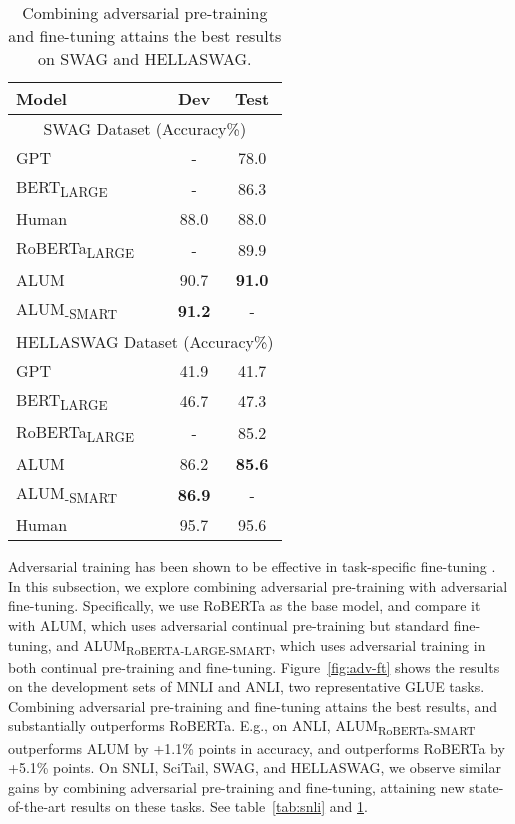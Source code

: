 \documentclass[11pt,a4paper]{article}
\newcommand\DNAME{ALUM}
\newcommand{\robertalarge}{RoBERTa}
\newcommand{\alumrobertalarge}{ALUM}
\begin{document}
\begin{table}[htb!]
	\begin{center}
		\begin{tabular}{@{\hskip1pt}l | c | c @{\hskip1pt}}
	\toprule    
	
	   \bf Model &Dev& Test  \\ \hline 

		\multicolumn{3}{c}{ SWAG Dataset (Accuracy\%)}  \\ \hline 
		GPT \cite{gpt22019} &- & 78.0 \\
		\hline
		BERT\textsubscript{LARGE} \cite{devlin2018bert} &-& 86.3\\ \hline		
		Human\cite{zellers2018swag} & 88.0 &88.0 \\ \hline
		RoBERTa\textsubscript{LARGE} \cite{liu2019roberta} &-& 89.9\\ \hline				
		{\alumrobertalarge{}}&90.7& \textbf{91.0}\\ \hline	
{\alumrobertalarge{}}\textsubscript{-SMART}&\textbf{91.2}& -\\ \hline		
		\hline
		\multicolumn{3}{c}{HELLASWAG Dataset (Accuracy\%)}  \\ \hline 
		GPT \cite{zellers2019hellaswag} &41.9 &41.7 \\ \hline
		BERT\textsubscript{LARGE}\cite{zellers2019hellaswag} &46.7& 47.3\\ \hline		
RoBERTa\textsubscript{LARGE}\cite{liu2019roberta} &-& 85.2\\ \hline		
		{\alumrobertalarge{}} &86.2& \textbf{85.6}\\ \hline
{\alumrobertalarge{}}\textsubscript{-SMART}&\textbf{86.9}& -\\ \hline \hline	
		Human & 95.7 &95.6 \\ 	
		\bottomrule
		\end{tabular}
	\end{center}
	\caption{Combining adversarial pre-training and fine-tuning attains the best results on SWAG and HELLASWAG.}
\label{tab:swag}
\end{table}


Adversarial training has been shown to be effective in task-specific fine-tuning \cite{jiang2019smart, zhu2019freelb}. In this subsection, we explore combining adversarial pre-training with adversarial fine-tuning.  
Specifically, we use \robertalarge{} as the base model, and compare it with \alumrobertalarge{}, which uses adversarial continual pre-training but standard fine-tuning, and 
{\DNAME}\textsubscript{RoBERTA-LARGE-SMART}, which uses adversarial training in both continual pre-training and fine-tuning. 
Figure~\ref{fig:adv-ft} shows the results on the development sets of MNLI and ANLI, two representative GLUE tasks. 
Combining adversarial pre-training and fine-tuning attains the best results, and substantially outperforms \robertalarge{}.
E.g., on ANLI, {\DNAME\textsubscript{RoBERTa-SMART}} outperforms \alumrobertalarge{} by +1.1\% points in accuracy, and outperforms \robertalarge{} by +5.1\% points.
On SNLI, SciTail, SWAG, and HELLASWAG, we observe similar gains by combining adversarial pre-training and fine-tuning, attaining new state-of-the-art results on these tasks. See table~\ref{tab:snli} and \ref{tab:swag}.
 
\end{document}
